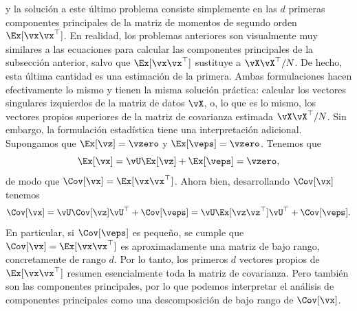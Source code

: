 \documentclass[../../book-main.tex]{subfiles}
\begin{document}
y la solución a este último problema consiste simplemente en las \(d\) primeras
componentes principales de la matriz de momentos de segundo orden
\(\Ex[\vx\vx^{\top}]\). En realidad, los problemas anteriores son visualmente
muy similares a las ecuaciones para calcular las componentes principales
de la subsección anterior, salvo que \(\Ex[\vx\vx^{\top}]\)
sustituye a \(\vX\vX^{\top}/N\). De hecho, esta última cantidad es una
estimación de la primera. Ambas formulaciones hacen efectivamente lo mismo
y tienen la misma solución práctica: calcular los vectores singulares
izquierdos de la matriz de datos \(\vX\), o, lo que es lo mismo, los
vectores propios superiores de la matriz de covarianza estimada \(\vX\vX^{\top}/N\).
Sin embargo, la formulación estadística tiene una
interpretación adicional. Supongamos que \(\Ex[\vz] = \vzero\) y \(\Ex[\veps] =
\vzero\). Tenemos que
\begin{equation}
    \Ex[\vx] = \vU\Ex[\vz] + \Ex[\veps] = \vzero,
\end{equation}
de modo que \(\Cov[\vx] = \Ex[\vx\vx^{\top}]\). Ahora bien, desarrollando
\(\Cov[\vx]\) tenemos
\begin{equation}
    \Cov[\vx] = \vU\Cov[\vz]\vU^{\top} + \Cov[\veps] =
    \vU\Ex[\vz\vz^{\top}]\vU^{\top} + \Cov[\veps].
\end{equation}
En particular, si \(\Cov[\veps]\) es pequeño, se cumple que \(\Cov[\vx]
= \Ex[\vx\vx^{\top}]\) es aproximadamente una matriz de bajo rango,
concretamente de rango \(d\). Por lo tanto, los primeros \(d\) vectores propios de
\(\Ex[\vx\vx^{\top}]\) resumen esencialmente toda la matriz de covarianza.
Pero también son las componentes principales, por lo que podemos
interpretar el análisis de componentes principales como una descomposición de bajo rango
de \(\Cov[\vx]\).
\end{document}
